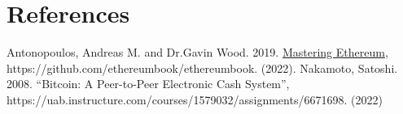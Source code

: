 \documentclass{article}
\begin{document}
\section{References}
Antonopoulos, Andreas M. and Dr.Gavin Wood. 2019. \underline{Mastering Ethereum}, 
\newline \indent https://github.com/ethereumbook/ethereumbook. (2022).
\newline Nakamoto, Satoshi. 2008. ``Bitcoin: A Peer-to-Peer Electronic Cash System'',
\newline \indent https://uab.instructure.com/courses/1579032/assignments/6671698. (2022)
\end{document}
